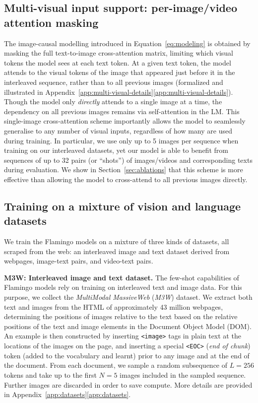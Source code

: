 \subsection{Multi-visual input support: per-image/video attention masking}
\label{sec:multi_im_att}

The image-causal modelling introduced in Equation~\eqref{eq:modeling} is obtained by masking the full text-to-image cross-attention matrix, limiting which visual tokens the model sees at each text token. At a given text token, the model attends to the visual tokens of the image that appeared just before it in the interleaved sequence, rather than to all previous images (formalized and illustrated in Appendix~\ifwithappendix\ref{app:multi-visual-details}\else\ref*{app:multi-visual-details}\fi).
Though the model only \textit{directly} attends to a single image at a time, the dependency on all previous images remains via self-attention in the LM. This single-image cross-attention scheme importantly allows the model to seamlessly generalise to any number of visual inputs, regardless of how many are used during training. In particular, we use only up to 5 images per sequence when training on our interleaved datasets, yet our model is able to benefit from sequences of up to 32 pairs (or ``shots'') of images/videos and corresponding texts during evaluation. We show in Section~\ref{sec:ablations} that this scheme is more effective than allowing the model to cross-attend to all previous images directly.

\subsection{Training on a mixture of vision and language datasets}
\label{sec:datasets}\label{sec:training}

We train the Flamingo models on a mixture of three kinds of datasets, all scraped from the web: an interleaved image and text dataset derived from webpages, image-text pairs, and video-text pairs. 

\textbf{M3W: Interleaved image and text dataset.}
\label{sec:interleaved_datasets}
The few-shot capabilities of Flamingo models rely on training on interleaved text and image data. For this purpose, we collect the \emph{MultiModal MassiveWeb} (\emph{M3W}) dataset. We extract both text and images from the HTML of approximately 43 million webpages, determining the positions of images relative to the text based on the relative positions of the text and image elements in the Document Object Model (DOM). An example is then constructed by inserting \texttt{<image>} tags in plain text at the locations of the images on the page, and inserting a special \texttt{<EOC>} (\textit{end of chunk}) token (added to the vocabulary and learnt) prior to any image and at the end of the document. From each document, we sample a random subsequence of $L=256$ tokens and take up to the first $N=5$ images included in the sampled sequence. Further images are discarded in order to save compute. More details are provided in Appendix~\ifwithappendix\ref{app:datasets}\else\ref*{app:datasets}\fi.

